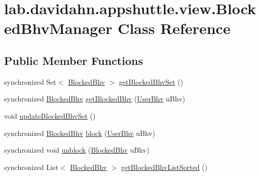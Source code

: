 \hypertarget{classlab_1_1davidahn_1_1appshuttle_1_1view_1_1_blocked_bhv_manager}{\section{lab.\-davidahn.\-appshuttle.\-view.\-Blocked\-Bhv\-Manager \-Class \-Reference}
\label{classlab_1_1davidahn_1_1appshuttle_1_1view_1_1_blocked_bhv_manager}
}
\subsection*{\-Public \-Member \-Functions}
\begin{DoxyCompactItemize}
\item 
synchronized \-Set$<$ \hyperlink{classlab_1_1davidahn_1_1appshuttle_1_1view_1_1_blocked_bhv}{\-Blocked\-Bhv} $>$ \hyperlink{classlab_1_1davidahn_1_1appshuttle_1_1view_1_1_blocked_bhv_manager_a200d33e8f25498abf577c410e671f86d}{get\-Blocked\-Bhv\-Set} ()
\item 
synchronized \hyperlink{classlab_1_1davidahn_1_1appshuttle_1_1view_1_1_blocked_bhv}{\-Blocked\-Bhv} \hyperlink{classlab_1_1davidahn_1_1appshuttle_1_1view_1_1_blocked_bhv_manager_a2f16ad0ac758d0879ac0f7a043d6732e}{get\-Blocked\-Bhv} (\hyperlink{interfacelab_1_1davidahn_1_1appshuttle_1_1collect_1_1bhv_1_1_user_bhv}{\-User\-Bhv} u\-Bhv)
\item 
void \hyperlink{classlab_1_1davidahn_1_1appshuttle_1_1view_1_1_blocked_bhv_manager_a3adb57c6599b945e538f892372790358}{update\-Blocked\-Bhv\-Set} ()
\item 
synchronized \hyperlink{classlab_1_1davidahn_1_1appshuttle_1_1view_1_1_blocked_bhv}{\-Blocked\-Bhv} \hyperlink{classlab_1_1davidahn_1_1appshuttle_1_1view_1_1_blocked_bhv_manager_a13166f2c1bf8e747843c4fdc1a0ca4e0}{block} (\hyperlink{interfacelab_1_1davidahn_1_1appshuttle_1_1collect_1_1bhv_1_1_user_bhv}{\-User\-Bhv} u\-Bhv)
\item 
synchronized void \hyperlink{classlab_1_1davidahn_1_1appshuttle_1_1view_1_1_blocked_bhv_manager_a139789df63aeb1dd54f412c12a0688fa}{unblock} (\hyperlink{classlab_1_1davidahn_1_1appshuttle_1_1view_1_1_blocked_bhv}{\-Blocked\-Bhv} u\-Bhv)
\item 
synchronized \-List$<$ \hyperlink{classlab_1_1davidahn_1_1appshuttle_1_1view_1_1_blocked_bhv}{\-Blocked\-Bhv} $>$ \hyperlink{classlab_1_1davidahn_1_1appshuttle_1_1view_1_1_blocked_bhv_manager_a7f4135bd719ba80f982e53391bde9075}{get\-Blocked\-Bhv\-List\-Sorted} ()
\end{DoxyCompactItemize}

